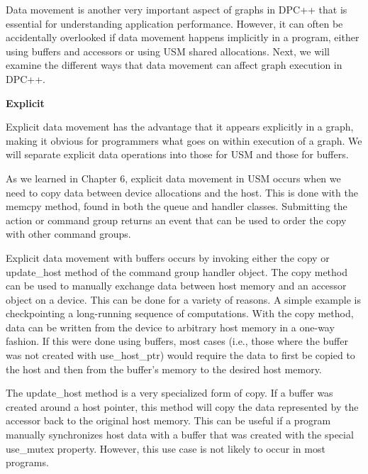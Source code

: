 Data movement is another very important aspect of graphs in DPC++ that is essential for understanding application performance. However, it can often be accidentally overlooked if data movement happens implicitly in a program, either using buffers and accessors or using USM shared allocations. Next, we will examine the different ways that data movement can affect graph execution in DPC++.\par

\hspace*{\fill} \par %
\textbf{Explicit}

Explicit data movement has the advantage that it appears explicitly in a graph, making it obvious for programmers what goes on within execution of a graph. We will separate explicit data operations into those for USM and those for buffers.\par

As we learned in Chapter 6, explicit data movement in USM occurs when we need to copy data between device allocations and the host. This is done with the memcpy method, found in both the queue and handler classes. Submitting the action or command group returns an event that can be used to order the copy with other command groups.\par

Explicit data movement with buffers occurs by invoking either the copy or update\_host method of the command group handler object. The copy method can be used to manually exchange data between host memory and an accessor object on a device. This can be done for a variety of reasons. A simple example is checkpointing a long-running sequence of computations. With the copy method, data can be written from the device to arbitrary host memory in a one-way fashion. If this were done using buffers, most cases (i.e., those where the buffer was not created with use\_host\_ptr) would require the data to first be copied to the host and then from the buffer’s memory to the desired host memory.\par

The update\_host method is a very specialized form of copy. If a buffer was created around a host pointer, this method will copy the data represented by the accessor back to the original host memory. This can be useful if a program manually synchronizes host data with a buffer that was created with the special use\_mutex property. However, this use case is not likely to occur in most programs.\par

